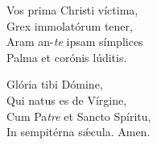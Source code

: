 Vos prima Christi víctima,\\
Grex immolatórum tener,\\
Aram an-\textit{te} ipsam símplices\\
Palma et corónis lúditis.

Glória tibi Dómine,\\
Qui natus es de Vírgine,\\
Cum Pa\tinyhspace\textit{tre} et San\-cto Spíritu,\\
In sempitérna sǽcula.
Amen.